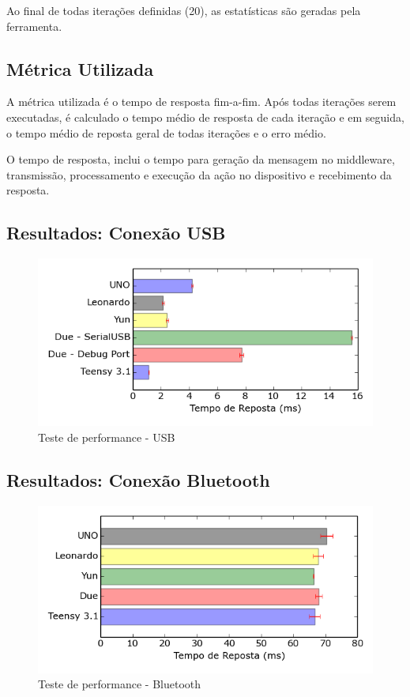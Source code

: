 Ao final de todas iterações definidas (20), as estatísticas são geradas
pela ferramenta.

\subsection{Métrica Utilizada}

A métrica utilizada é o tempo de resposta fim-a-fim. Após todas iterações
serem executadas, é calculado o tempo médio de resposta de cada iteração
e em seguida, o tempo médio de reposta geral de todas iterações e
o erro médio.

O tempo de resposta, inclui o tempo para geração da mensagem no middleware,
transmissão, processamento e execução da ação no dispositivo e recebimento
da resposta.

\subsection{Resultados: Conexão USB}

\begin{figure}[H]
\begin{centering}
\includegraphics[width=0.8\linewidth]{Imagens/Cap_5/usb}
\par\end{centering}
\caption{Teste de performance - USB\label{fig:perf-usb}}
\end{figure}


\subsection{Resultados: Conexão Bluetooth}

\begin{figure}[H]
\begin{centering}
\includegraphics[width=0.8\linewidth]{Imagens/Cap_5/bluetooth}
\par\end{centering}
\caption{Teste de performance - Bluetooth\label{fig:perf-bluetooth}}
\end{figure}


